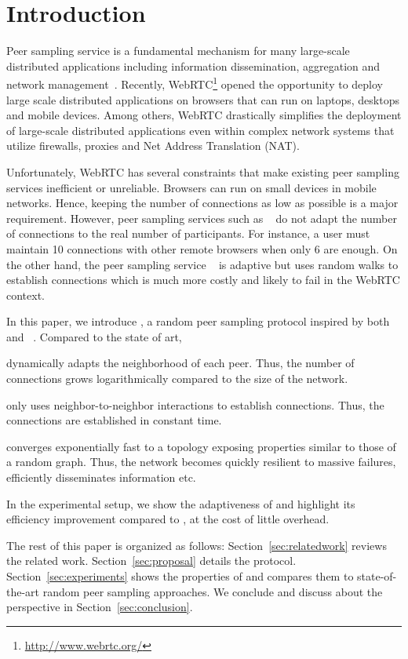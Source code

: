 
\section{Introduction}

Peer sampling service is a fundamental mechanism for many large-scale
distributed applications including information dissemination, aggregation and
network management~\cite{jelasity2007gossip}. Recently,
WebRTC\footnote{\url{http://www.webrtc.org/}} opened the opportunity to deploy
large scale distributed applications on brow\-sers that can run on laptops,
desktops and mobile devices. Among others, WebRTC drastically simplifies
the deployment of large-scale distributed applications even within complex
network systems that utilize firewalls, proxies and Net Address Translation
(NAT).

Unfortunately, WebRTC has several constraints that make existing peer
sampling services inefficient or unreliable. Brow\-sers can run
on small devices in mobile networks. Hence, keeping the number of
connections as low as possible is a major requirement. However, peer
sampling services such as \CYCLON~\cite{voulgaris2005cyclon} do not
adapt the number of connections to the real number of
participants. For instance, a user must maintain 10 connections with
other remote browsers when only 6 are enough. On the other hand, the
peer sampling service \SCAMP~\cite{ganesh2003peer} is adaptive but
uses random walks to establish connections which is much more
costly and likely to fail in the WebRTC context.

In this paper, we introduce \SPRAY, a random peer sampling protocol inspired
by both \CYCLON~\cite{voulgaris2005cyclon} and
\SCAMP~\cite{ganesh2003peer}. Compared to the state of art,
\begin{inparaenum}[(i)]
\item \SPRAY dynamically adapts the neighborhood of each peer. Thus, the number
  of connections grows logarithmically compared to the size of the network.
\item \SPRAY only uses neighbor-to-neighbor interactions to establish
  connections. Thus, the connections are established in constant time.
\item \SPRAY converges exponentially fast to a topology exposing properties
  similar to those of a random graph. Thus, the network becomes quickly
  resilient to massive failures, efficiently disseminates information etc.
\item In the experimental setup, we show the adaptiveness of \SPRAY and
  highlight its efficiency improvement compared to \CYCLON, at the cost of
  little overhead.
\end{inparaenum}

The rest of this paper is organized as follows: Section~\ref{sec:relatedwork}
reviews the related work. Section~\ref{sec:proposal} details the \SPRAY
protocol. Section~\ref{sec:experiments} shows the properties of \SPRAY
and compares them to state-of-the-art random peer sampling approaches. We
conclude and discuss about the perspective in Section~\ref{sec:conclusion}.

